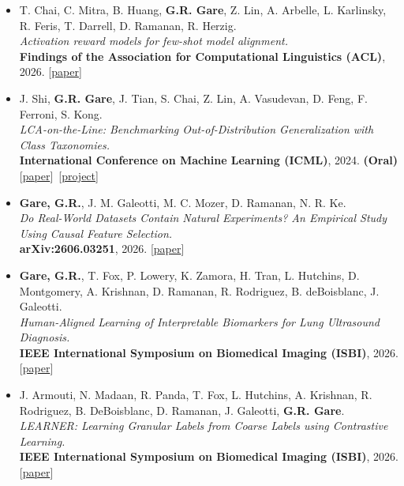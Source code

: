 \documentclass[10pt,a4paper,ragged2e,withhyper]{altacv}
\newcommand{\publink}[2]{{\small[\href{#1}{#2}]}}
\begin{document}
\begin{itemize}
\item T. Chai, C. Mitra, B. Huang, \textbf{G.R. Gare}, Z. Lin, A. Arbelle, L. Karlinsky, R. Feris, T. Darrell, D. Ramanan, R. Herzig.\\
\emph{Activation reward models for few-shot model alignment.}\\
\textbf{Findings of the Association for Computational Linguistics (ACL)}, 2026.
\publink{https://aclanthology.org/2026.findings-acl.1709/}{paper}
\divider

\item J. Shi, \textbf{G.R. Gare}, J. Tian, S. Chai, Z. Lin, A. Vasudevan, D. Feng, F. Ferroni, S. Kong.\\
\emph{LCA-on-the-Line: Benchmarking Out-of-Distribution Generalization with Class Taxonomies.}\\
\textbf{International Conference on Machine Learning (ICML)}, 2024. \textbf{(Oral)}
\publink{https://proceedings.mlr.press/v235/shi24d.html}{paper}~\publink{https://elvishelvis.github.io/papers/lca/}{project}
\divider

\item \textbf{Gare, G.R.}, J. M. Galeotti, M. C. Mozer, D. Ramanan, N. R. Ke.\\
\emph{Do Real-World Datasets Contain Natural Experiments? An Empirical Study Using Causal Feature Selection.}\\
\textbf{arXiv:2606.03251}, 2026.
\publink{https://arxiv.org/abs/2606.03251}{paper}
\divider

\item \textbf{Gare, G.R.}, T. Fox, P. Lowery, K. Zamora, H. Tran, L. Hutchins, D. Montgomery, A. Krishnan, D. Ramanan, R. Rodriguez, B. deBoisblanc, J. Galeotti.\\
\emph{Human-Aligned Learning of Interpretable Biomarkers for Lung Ultrasound Diagnosis.}\\
\textbf{IEEE International Symposium on Biomedical Imaging (ISBI)}, 2026.
\publink{https://arxiv.org/abs/2206.08398}{paper}
\divider

\item J. Armouti, N. Madaan, R. Panda, T. Fox, L. Hutchins, A. Krishnan, R. Rodriguez, B. DeBoisblanc, D. Ramanan, J. Galeotti, \textbf{G.R. Gare}.\\
\emph{LEARNER: Learning Granular Labels from Coarse Labels using Contrastive Learning.}\\
\textbf{IEEE International Symposium on Biomedical Imaging (ISBI)}, 2026.
\publink{https://arxiv.org/abs/2411.01144}{paper}
\divider


\end{itemize}
\end{document}
